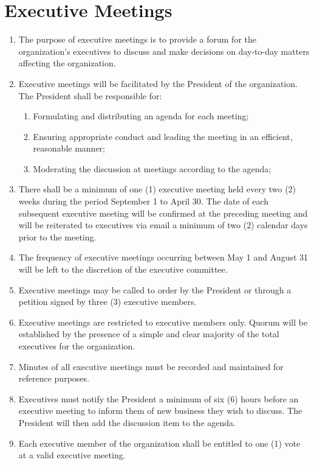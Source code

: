 \documentclass[12pt]{article}
\begin{document}
\section{Executive Meetings}
\begin{enumerate}[{8}.1]
    \item The purpose of executive meetings is to provide a forum for the organization’s executives to discuss and make decisions on day-to-day matters affecting the organization. 
    \item Executive meetings will be facilitated by the President of the organization. The President shall be responsible for:
    \begin{enumerate}[{8.2}.1]
        \item	Formulating and distributing an agenda for each meeting;
        \item	Ensuring appropriate conduct and leading the meeting in an efficient, reasonable manner;
        \item	Moderating the discussion at meetings according to the agenda;
    \end{enumerate}
    \item There shall be a minimum of one (1) executive meeting held every two (2) weeks during the period September 1 to April 30. The date of each subsequent executive meeting will be confirmed at the preceding meeting and will be reiterated to executives via email a minimum of two (2) calendar days prior to the meeting.
    \item The frequency of executive meetings occurring between May 1 and August 31 will be left to the discretion of the executive committee. 
    \item Executive meetings may be called to order by the President or through a petition signed by three (3) executive members. 
    \item Executive meetings are restricted to executive members only. Quorum will be established by the presence of a simple and clear majority of the total executives for the organization.
    \item Minutes of all executive meetings must be recorded and maintained for reference purposes.
    \item Executives must notify the President a minimum of six (6) hours before an executive meeting to inform them of new business they wish to discuss. The President will then add the discussion item to the agenda.
    \item Each executive member of the organization shall be entitled to one (1) vote at a valid executive meeting. 

\end{enumerate}
\end{document}
